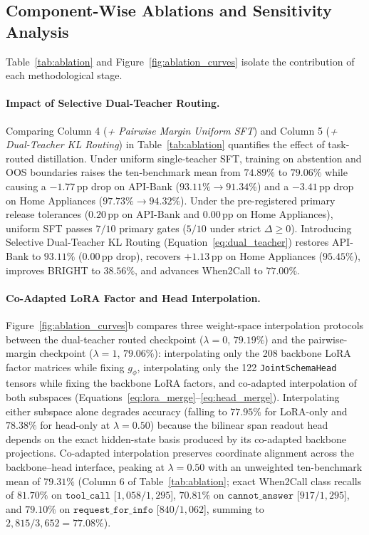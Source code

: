 \documentclass[10pt,twocolumn]{article}
\begin{document}
\subsection{Component-Wise Ablations and Sensitivity Analysis}
Table~\ref{tab:ablation} and Figure~\ref{fig:ablation_curves} isolate the contribution of each methodological stage.

\paragraph{Impact of Selective Dual-Teacher Routing.}
Comparing Column 4 (\emph{+ Pairwise Margin Uniform SFT}) and Column 5 (\emph{+ Dual-Teacher KL Routing}) in Table~\ref{tab:ablation} quantifies the effect of task-routed distillation. Under uniform single-teacher SFT, training on abstention and OOS boundaries raises the ten-benchmark mean from $74.89\%$ to $79.06\%$ while causing a $-1.77$\,pp drop on API-Bank ($93.11\% \to 91.34\%$) and a $-3.41$\,pp drop on Home Appliances ($97.73\% \to 94.32\%$). Under the pre-registered primary release tolerances ($0.20$\,pp on API-Bank and $0.00$\,pp on Home Appliances), uniform SFT passes $7/10$ primary gates ($5/10$ under strict $\Delta \ge 0$). Introducing Selective Dual-Teacher KL Routing (Equation~\ref{eq:dual_teacher}) restores API-Bank to $93.11\%$ ($0.00$\,pp drop), recovers $+1.13$\,pp on Home Appliances ($95.45\%$), improves BRIGHT to $38.56\%$, and advances When2Call to $77.00\%$.

\paragraph{Co-Adapted LoRA Factor and Head Interpolation.}
Figure~\ref{fig:ablation_curves}b compares three weight-space interpolation protocols between the dual-teacher routed checkpoint ($\lambda = 0$, $79.19\%$) and the pairwise-margin checkpoint ($\lambda = 1$, $79.06\%$): interpolating only the 208 backbone LoRA factor matrices while fixing $g_\phi$, interpolating only the 122 \texttt{JointSchemaHead} tensors while fixing the backbone LoRA factors, and co-adapted interpolation of both subspaces (Equations~\ref{eq:lora_merge}--\ref{eq:head_merge}). Interpolating either subspace alone degrades accuracy (falling to $77.95\%$ for LoRA-only and $78.38\%$ for head-only at $\lambda = 0.50$) because the bilinear span readout head depends on the exact hidden-state basis produced by its co-adapted backbone projections. Co-adapted interpolation preserves coordinate alignment across the backbone--head interface, peaking at $\lambda = 0.50$ with an unweighted ten-benchmark mean of $79.31\%$ (Column 6 of Table~\ref{tab:ablation}; exact When2Call class recalls of $81.70\%$ on $\texttt{tool\_call}$ [$1{,}058/1{,}295$], $70.81\%$ on $\texttt{cannot\_answer}$ [$917/1{,}295$], and $79.10\%$ on $\texttt{request\_for\_info}$ [$840/1{,}062$], summing to $2{,}815 / 3{,}652 = 77.08\%$).
\end{document}
